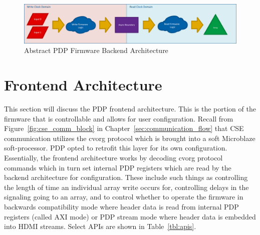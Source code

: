     \begin{figure}
        \centering
        \includegraphics[width=1.0\textwidth]{fig/abstract_architecture.pdf}
        \caption{Abstract PDP Firmware Backend Architecture}
        \label{fig:abstract_architecture}
    \end{figure}

\section{Frontend Architecture}
    \label{sec:frontend_arch}
    This section will discuss the PDP frontend architecture. This is the portion of the firmware that is controllable and allows for user configuration. Recall from Figure~\ref{fig:cse_comm_block} in Chapter~\ref{sec:communication_flow} that CSE communication utilizes the cvorg protocol which is brought into a soft Microblaze soft-processor. PDP opted to retrofit this layer for its own configuration. Essentially, the frontend architecture works by decoding cvorg protocol commands which in turn set internal PDP registers which are read by the backend architecture for configuration. These include such things as controlling the length of time an individual array write occurs for, controlling delays in the signaling going to an array, and to control whether to operate the firmware in backwards compatibility mode where header data is read from internal PDP registers (called AXI mode) or PDP stream mode where header data is embedded into HDMI streams. Select APIs are shown in Table~\ref{tbl:apis}.

